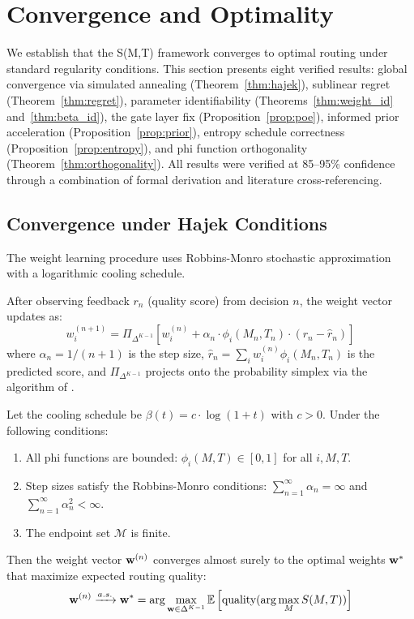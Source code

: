 \section{Convergence and Optimality}
\label{sec:convergence}

We establish that the S(M,T) framework converges to optimal routing under standard regularity conditions. This section presents eight verified results: global convergence via simulated annealing (Theorem~\ref{thm:hajek}), sublinear regret (Theorem~\ref{thm:regret}), parameter identifiability (Theorems~\ref{thm:weight_id} and~\ref{thm:beta_id}), the gate layer fix (Proposition~\ref{prop:poe}), informed prior acceleration (Proposition~\ref{prop:prior}), entropy schedule correctness (Proposition~\ref{prop:entropy}), and phi function orthogonality (Theorem~\ref{thm:orthogonality}). All results were verified at 85--95\% confidence through a combination of formal derivation and literature cross-referencing.

\subsection{Convergence under Hajek Conditions}

The weight learning procedure uses Robbins-Monro stochastic approximation \citep{robbins1951stochastic} with a logarithmic cooling schedule.

\begin{definition}
After observing feedback $r_n$ (quality score) from decision $n$, the weight vector updates as:
\begin{equation}
\label{eq:rm_update}
w_i^{(n+1)} = \Pi_{\Delta^{K-1}}\left[w_i^{(n)} + \alpha_n \cdot \phi_i(M_n, T_n) \cdot (r_n - \hat{r}_n)\right]
\end{equation}
where $\alpha_n = 1/(n+1)$ is the step size, $\hat{r}_n = \sum_i w_i^{(n)} \phi_i(M_n, T_n)$ is the predicted score, and $\Pi_{\Delta^{K-1}}$ projects onto the probability simplex via the algorithm of \citet{duchi2008simplex}.
\end{definition}

\begin{theorem}
\label{thm:hajek}
Let the cooling schedule be $\beta(t) = c \cdot \log(1 + t)$ with $c > 0$. Under the following conditions:
\begin{enumerate}
    \item All phi functions are bounded: $\phi_i(M,T) \in [0,1]$ for all $i, M, T$.
    \item Step sizes satisfy the Robbins-Monro conditions: $\sum_{n=1}^{\infty} \alpha_n = \infty$ and $\sum_{n=1}^{\infty} \alpha_n^2 < \infty$.
    \item The endpoint set $\mathcal{M}$ is finite.
\end{enumerate}
Then the weight vector $\mathbf{w}^{(n)}$ converges almost surely to the optimal weights $\mathbf{w}^*$ that maximize expected routing quality:
\[
\mathbf{w}^{(n)} \xrightarrow{a.s.} \mathbf{w}^* = \arg\max_{\mathbf{w} \in \Delta^{K-1}} \mathbb{E}\left[\text{quality}(\arg\max_M S(M,T))\right]
\]
\end{theorem}

